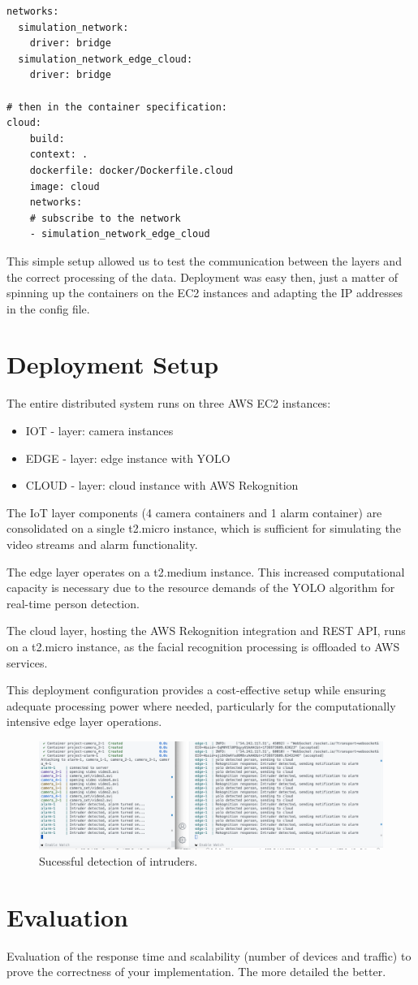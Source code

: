 \documentclass[conference]{IEEEtran}
\begin{document}
\begin{verbatim}
networks:
  simulation_network:
    driver: bridge
  simulation_network_edge_cloud:
    driver: bridge

# then in the container specification: 
cloud: 
    build:
    context: .
    dockerfile: docker/Dockerfile.cloud
    image: cloud
    networks:
    # subscribe to the network
    - simulation_network_edge_cloud 
\end{verbatim}

This simple setup allowed us to test the communication between the layers and the correct processing of the data. 
Deployment was easy then, just a matter of spinning up the containers on the EC2 instances and adapting the IP addresses in the config file.

\section{Deployment Setup}
The entire distributed system runs on three AWS EC2 instances:
\begin{itemize}
    \item IOT - layer: camera instances
    \item EDGE - layer: edge instance with YOLO
    \item CLOUD - layer: cloud instance with AWS Rekognition
\end{itemize}

\hfill \break

The IoT layer components (4 camera containers and 1 alarm container) are consolidated on a single t2.micro instance, which is sufficient for simulating the video streams and alarm functionality.

The edge layer operates on a t2.medium instance. This increased computational capacity is necessary due to the resource demands of the YOLO algorithm for real-time person detection.

The cloud layer, hosting the AWS Rekognition integration and REST API, runs on a t2.micro instance, as the facial recognition processing is offloaded to AWS services.

This deployment configuration provides a cost-effective setup while ensuring adequate processing power where needed, particularly for the computationally intensive edge layer operations.

\begin{figure}[h!]
    \centering
    \includegraphics[width=1\linewidth]{deployment2.png}
    \caption{Sucessful detection of intruders.}
    \label{fig:deployment}
\end{figure}
\section{Evaluation}
Evaluation of the response time and scalability (number of devices and traffic) to prove the correctness of your implementation. The more detailed the better. 
\end{document}
